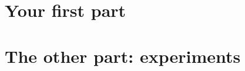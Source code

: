 \documentclass[parskip=half,10pt,twoside]{scrbook}
\begin{document}
\part{Your first part}
\label{par:rules}


% 
% 

 \part{The other part: experiments}
 \label{par:ml}

%


 
 
 
 \appendix
  
  
  


\clearpage

\backmatter

\manualmark
\markboth{\spacedlowsmallcaps{\bibname}}{\spacedlowsmallcaps{\bibname}} %





% 


\clearpage {} \manualmark {}


\printindex
\end{document}
